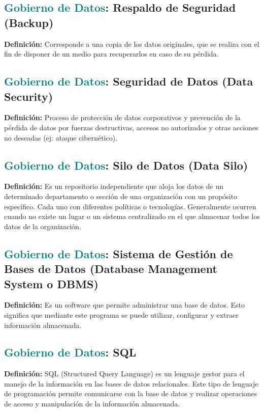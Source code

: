 \documentclass[12pt]{article}
\begin{document}
\subsection{\textcolor{teal}{Gobierno de Datos}: Respaldo de Seguridad (Backup)}
\textbf{Definición:} Corresponde a una copia de los datos originales, que se realiza con el fin de disponer de un medio para recuperarlos en caso de su pérdida.
\subsection{\textcolor{teal}{Gobierno de Datos}: Seguridad de Datos (Data Security)}
\textbf{Definición:} Proceso de protección de datos corporativos y prevención de la pérdida de datos por fuerzas destructivas, accesos no autorizados y otras acciones no deseadas (ej: ataque cibernético).
\subsection{\textcolor{teal}{Gobierno de Datos}: Silo de Datos (Data Silo)}
\textbf{Definición:} Es un repositorio independiente que aloja los datos de un determinado departamento o sección de una organización con un propósito específico. Cada uno con diferentes políticas o tecnologías. Generalmente ocurren cuando no existe un lugar o un sistema centralizado en el que almacenar todos los datos de la organización. 
\subsection{\textcolor{teal}{Gobierno de Datos}: Sistema de Gestión de Bases de Datos (Database Management System o DBMS)}
\textbf{Definición:} Es un software que permite administrar una base de datos. Esto significa que mediante este programa se puede utilizar, configurar y extraer información almacenada.
\subsection{\textcolor{teal}{Gobierno de Datos}: SQL}
\textbf{Definición:} SQL (Structured Query Language) es un lenguaje gestor para el manejo de la información en las bases de datos relacionales. Este tipo de lenguaje de programación permite comunicarse con la base de datos y realizar operaciones de acceso y manipulación de la información almacenada.
\end{document}
